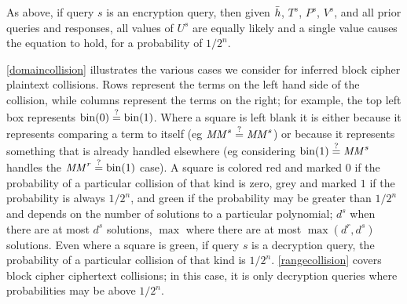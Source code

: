 \documentclass[hctr2.tex]{subfiles}
\begin{document}
As above, if query \(s\) is an encryption query,
then given \(\bar{h}\), \(T^s\), \(P^s\), \(V^s\),
and all prior queries and responses,
all values of \(U^s\) are equally likely
and a single value causes the equation to hold,
for a probability of \(1/2^n\).

\autoref{domaincollision} illustrates the various cases
we consider for inferred block cipher plaintext collisions.
Rows represent the terms
on the left hand side of the collision, while
columns represent the terms on the right; 
for example, the top left box represents
\(\operatorname{bin}(0) \stackrel{\text{?}}{=} \operatorname{bin}(1)\). Where a square is left blank
it is either because it represents
comparing a term to itself (eg \(\mathit{MM}^s \stackrel{\text{?}}{=} \mathit{MM}^s\))
or because it represents something that
is already handled elsewhere
(eg considering \(\operatorname{bin}(1) \stackrel{\text{?}}{=} \mathit{MM}^s\)
handles the \(\mathit{MM}^r \stackrel{\text{?}}{=} \operatorname{bin}(1)\) case).
A square is colored red
and marked \(0\) if the
probability of a particular collision
of that kind is zero, grey
and marked \(1\) if
the probability is always \(1/2^n\),
and green if the probability may be
greater than \(1/2^n\) and depends
on the number of solutions to a
particular polynomial;
\(d^s\) when there are at most \(d^s\) solutions,
\(\max\) where there are at most
\(\max(d^r, d^s)\) solutions.
Even where a square is green,
if query \(s\) is a decryption query,
the probability of a particular collision of
that kind is \(1/2^n\).
\autoref{rangecollision} covers
block cipher ciphertext collisions; in this case,
it is only decryption queries where
probabilities may be above \(1/2^n\).
\end{document}
